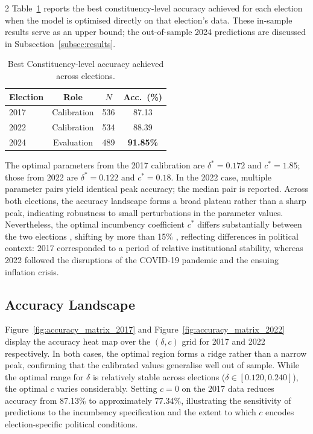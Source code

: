 \documentclass[10pt, a4paper]{article}
\begin{document}
\begin{multicols}{2}
Table~\ref{tab:accuracy} reports the best constituency-level accuracy achieved
for each election when the model is optimised directly on that election's data.
These in-sample results serve as an upper bound; the out-of-sample 2024
predictions are discussed in Subsection~\ref{subsec:results}.

\begin{table}[H]
\centering
\caption{Best Constituency-level accuracy achieved across elections.}
\label{tab:accuracy}
\small
\begin{tabular}{lccc}
\toprule
\textbf{Election} & \textbf{Role} & \textbf{$N$} & \textbf{Acc.\ (\%)} \\
\midrule
2017 & Calibration & 536 & 87.13 \\
2022 & Calibration & 534 & 88.39 \\
2024 & Evaluation  & 489 & \textbf{91.85\%} \\
\bottomrule
\end{tabular}
\end{table}

\noindent
The optimal parameters from the 2017 calibration are $\delta^* = 0.172$ and
$c^* = 1.85$; those from 2022 are $\delta^* = 0.122$ and $c^* = 0.18$.
In the 2022 case, multiple parameter pairs yield identical peak accuracy; the
median pair is reported. Across both elections, the accuracy landscape forms
a broad plateau rather than a sharp peak, indicating robustness to small
perturbations in the parameter values. Nevertheless, the optimal incumbency
coefficient $c^*$ differs substantially between the two elections ,
shifting by more than 15\% , reflecting differences in political context:
2017 corresponded to a period of relative institutional stability, whereas 2022
followed the disruptions of the COVID-19 pandemic and the ensuing inflation
crisis.

\subsection{Accuracy Landscape}

Figure~\ref{fig:accuracy_matrix_2017} and Figure~\ref{fig:accuracy_matrix_2022}
display the accuracy heat map over the $(\delta, c)$ grid for 2017 and 2022
respectively.
In both cases, the optimal region forms a ridge rather than a narrow peak,
confirming that the calibrated values generalise well out of sample.
While the optimal range for $\delta$ is relatively stable across elections
($\delta \in [0.120, 0.240]$), the optimal $c$ varies considerably. Setting
$c = 0$ on the 2017 data reduces accuracy from 87.13\% to approximately
77.34\%, illustrating the sensitivity of predictions to the incumbency
specification and the extent to which $c$ encodes election-specific political
conditions.


\end{multicols}
\end{document}
